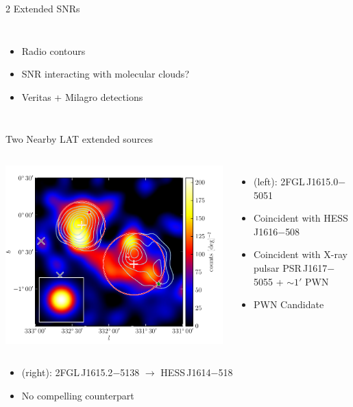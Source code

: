 \documentclass[12pt]{beamer}
\begin{document}
\begin{frame}{2 Extended SNRs}
\begin{columns}
    \begin{itemize}
      \item Radio contours
      \item SNR interacting with molecular clouds?
      \item Veritas + Milagro detections
      \end{itemize}
  \end{columns}
\end{frame}


\begin{frame}{Two Nearby LAT extended sources}


  \begin{columns}
    \includegraphics[scale=0.5]{plots/source_HESS_J1614-518_color.pdf}
    \begin{itemize}
    \item (left): 
      2FGL\,J1615.0$-$5051
    \item Coincident with HESS\,J1616$-$508
    \item Coincident with X-ray pulsar
PSR\,J1617$-$5055 + $\sim 1'$ PWN 
    \item PWN Candidate
    \end{itemize}
  \end{columns}

  \begin{itemize}
    \item (right):
      2FGL\,J1615.2$-$5138 $\rightarrow$ HESS\,J1614$-$518
    \item No compelling counterpart
  \end{itemize}
\end{frame}
\end{document}

